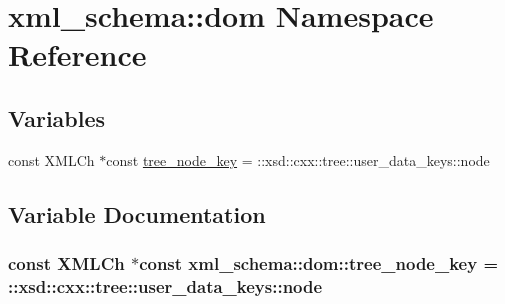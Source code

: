 \hypertarget{namespacexml__schema_1_1dom}{}\section{xml\+\_\+schema\+:\+:dom Namespace Reference}
\label{namespacexml__schema_1_1dom}
\subsection*{Variables}
\begin{DoxyCompactItemize}
\item 
const X\+M\+L\+Ch $\ast$const \hyperlink{namespacexml__schema_1_1dom_a825af74d328c3a1cb72aa9a61ddde150}{tree\+\_\+node\+\_\+key} = \+::xsd\+::cxx\+::tree\+::user\+\_\+data\+\_\+keys\+::node
\end{DoxyCompactItemize}


\subsection{Variable Documentation}
\subsubsection[{\texorpdfstring{tree\+\_\+node\+\_\+key}{tree_node_key}}]{\setlength{\rightskip}{0pt plus 5cm}const X\+M\+L\+Ch $\ast$const xml\+\_\+schema\+::dom\+::tree\+\_\+node\+\_\+key = \+::xsd\+::cxx\+::tree\+::user\+\_\+data\+\_\+keys\+::node}\hypertarget{namespacexml__schema_1_1dom_a825af74d328c3a1cb72aa9a61ddde150}{}\label{namespacexml__schema_1_1dom_a825af74d328c3a1cb72aa9a61ddde150}
